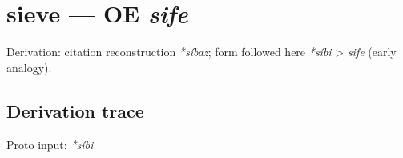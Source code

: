 \documentclass[
  british,
  a4paper,
  openany]{book}
\providecommand{\texorpdfstring}[2]{#1}
\begin{document}
\section{\texorpdfstring{sieve --- OE
\emph{sife}}{sieve --- OE sife}}\label{sieve-oe-sife}


Derivation: citation reconstruction \emph{*síbaz}; form followed here
\emph{*síbi} \textgreater{} \emph{sife} (early analogy).

\subsection{Derivation trace}\label{derivation-trace-95}

Proto input: \emph{*síbi}

\begingroup
\setlength{\fboxsep}{6pt}
\end{document}
